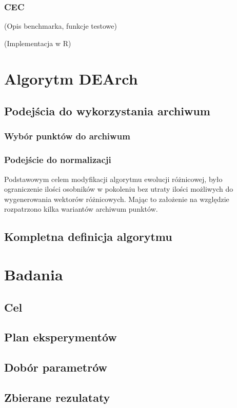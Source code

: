 \documentclass[11pt,a4paper]{report}
\begin{document}
{{\subsection{CEC}
\par{
(Opis benchmarka, funkcje testowe)
}
\par{
(Implementacja w R)
}

\chapter{Algorytm DEArch}

\par{

}
\section{Podejścia do wykorzystania archiwum}
\subsection{Wybór punktów do archiwum}
\subsection{Podejście do normalizacji}

Podstawowym celem modyfikacji algorytmu ewolucji różnicowej, było ograniczenie ilości osobników w pokoleniu bez utraty ilości możliwych do wygenerowania wektorów różnicowych. Mając to założenie na względzie rozpatrzono kilka wariantów archiwum punktów.
\section{Kompletna definicja algorytmu}

\chapter{Badania}
\section{Cel}
\section{Plan eksperymentów}
\section{Dobór parametrów}
\section{Zbierane rezulataty}
}}
\end{document}
